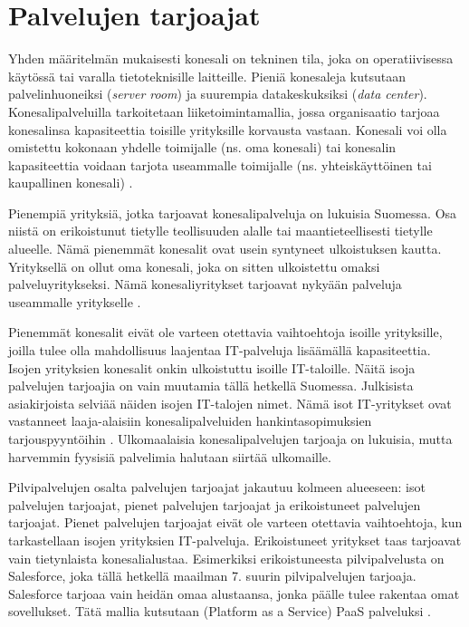 \section{Palvelujen tarjoajat}
Yhden määritelmän mukaisesti konesali on tekninen tila, joka on operatiivisessa käytössä tai varalla tietoteknisille laitteille. Pieniä konesaleja kutsutaan palvelinhuoneiksi (\emph{server room}) ja suurempia datakeskuksiksi (\emph{data center}). Konesalipalveluilla tarkoitetaan liiketoimintamallia, jossa organisaatio tarjoaa konesalinsa kapasiteettia toisille yrityksille korvausta vastaan. Konesali voi olla omistettu kokonaan yhdelle toimijalle (ns. oma konesali) tai konesalin kapasiteettia voidaan tarjota useammalle toimijalle (ns. yhteiskäyttöinen tai kaupallinen konesali) \citep{itewiki}.

Pienempiä yrityksiä, jotka tarjoavat konesalipalveluja on lukuisia Suomessa. Osa niistä on erikoistunut tietylle teollisuuden alalle tai maantieteellisesti tietylle alueelle. Nämä pienemmät konesalit ovat usein syntyneet ulkoistuksen kautta. Yrityksellä on ollut oma konesali, joka on sitten ulkoistettu omaksi palveluyritykseksi. Nämä konesaliyritykset tarjoavat nykyään palveluja useammalle yritykselle \citep{tnnet}.

Pienemmät konesalit eivät ole varteen otettavia vaihtoehtoja isoille yrityksille, joilla tulee olla mahdollisuus laajentaa IT-palveluja lisäämällä kapasiteettia. Isojen yrityksien konesalit onkin ulkoistuttu isoille IT-taloille. Näitä isoja palvelujen tarjoajia on vain muutamia tällä hetkellä Suomessa. Julkisista asiakirjoista selviää näiden isojen IT-talojen nimet. Nämä isot IT-yritykset ovat vastanneet laaja-alaisiin konesalipalveluiden hankintasopimuksien tarjouspyyntöihin \citep{nurmijarvi}. Ulkomaalaisia konesalipalvelujen tarjoaja on lukuisia, mutta harvemmin fyysisiä palvelimia halutaan siirtää ulkomaille.

Pilvipalvelujen osalta palvelujen tarjoajat jakautuu kolmeen alueeseen: isot palvelujen tarjoajat, pienet palvelujen tarjoajat ja erikoistuneet palvelujen tarjoajat. Pienet palvelujen tarjoajat eivät ole varteen otettavia vaihtoehtoja, kun tarkastellaan isojen yrityksien IT-palveluja. Erikoistuneet yritykset taas tarjoavat vain tietynlaista konesalialustaa. Esimerkiksi erikoistuneesta pilvipalvelusta on Salesforce, joka tällä hetkellä maailman 7. suurin pilvipalvelujen tarjoaja. Salesforce tarjoaa vain heidän omaa alustaansa, jonka päälle tulee rakentaa omat sovellukset. Tätä mallia kutsutaan (Platform as a Service) PaaS palveluksi \citep{top_cloud}.

